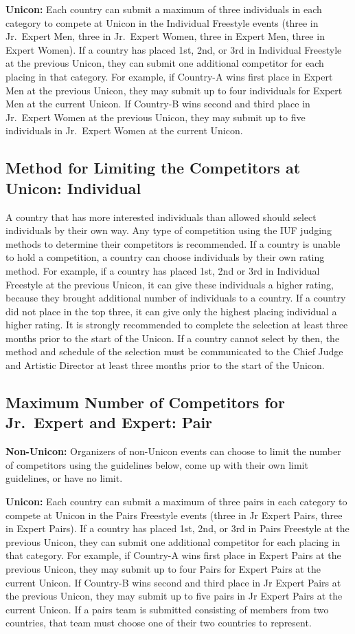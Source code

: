 \textbf{Unicon:} Each country can submit a maximum of three individuals in each category to compete at Unicon in the Individual Freestyle events (three in Jr.~Expert Men, 
three in Jr.~Expert Women, three in Expert Men, three in Expert Women).
If a country has placed 1st, 2nd, or 3rd in Individual Freestyle at the previous Unicon, they can submit one additional competitor for each placing in that category.
For example, if Country-A wins first place in Expert Men at the previous Unicon, they may submit up to four individuals for Expert Men at the current Unicon.
If Country-B wins second and third place in Jr.~Expert Women at the previous Unicon, they may submit up to five individuals in Jr.~Expert Women at the current Unicon.

\subsection{Method for Limiting the Competitors at Unicon: Individual} %
A country that has more interested individuals than allowed should select individuals by their own way.
Any type of competition using the IUF judging methods to determine their competitors is recommended.
If a country is unable to hold a competition, a country can choose individuals by their own rating method.
For example, if a country has placed 1st, 2nd or 3rd in Individual Freestyle at the previous Unicon, it can give these individuals a higher rating, 
because they brought additional number of individuals to a country.
If a country did not place in the top three, it can give only the highest placing individual a higher rating.
It is strongly recommended to complete the selection at least three months prior to the start of the Unicon.
If a country cannot select by then, the method and schedule of the selection must be communicated to the Chief Judge and Artistic Director at 
least three months prior to the start of the Unicon.

\subsection{Maximum Number of Competitors for Jr.~Expert and Expert: Pair}
\textbf{Non-Unicon:} Organizers of non-Unicon events can choose to limit the number of competitors using the guidelines below, come up with their own limit guidelines, or have no limit.

\textbf{Unicon:} Each country can submit a maximum of three pairs in each category to compete at Unicon in the Pairs Freestyle events (three in Jr Expert Pairs, three in Expert Pairs).
If a country has placed 1st, 2nd, or 3rd in Pairs Freestyle at the previous Unicon, they can submit one additional competitor for each placing in that category.
For example, if Country-A wins first place in Expert Pairs at the previous Unicon, they may submit up to four Pairs for Expert Pairs at the current Unicon.
If Country-B wins second and third place in Jr Expert Pairs at the previous Unicon, they may submit up to five pairs in Jr Expert Pairs at the current Unicon.
If a pairs team is submitted consisting of members from two countries, that team must choose one of their two countries to represent.

